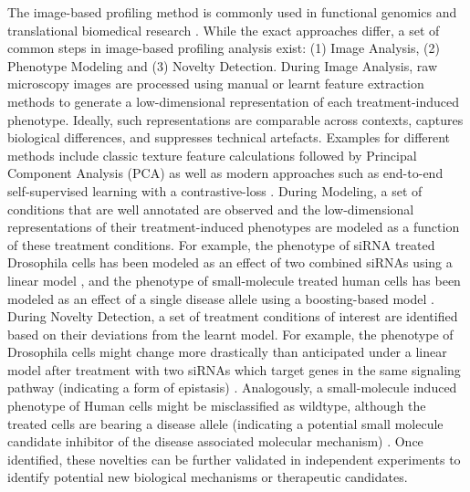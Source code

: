 \begin{flushleft}
The image-based profiling method is commonly used in functional genomics \parencite{lauferMappingGeneticInteractions2013, billmannGeneticInteractionMap2016} and translational biomedical research \parencite{gibsonStrategyIdentifyingRepurposed2015, moshkovPredictingCompoundActivity2023}. While the exact approaches differ, a set of common steps in image-based profiling analysis exist: (1) Image Analysis, (2) Phenotype Modeling and (3) Novelty Detection. During Image Analysis, raw microscopy images are processed using manual or learnt feature extraction methods to generate a low-dimensional representation of each treatment-induced phenotype. Ideally, such representations are comparable across contexts, captures biological differences, and suppresses technical artefacts. Examples for different methods include classic texture feature calculations followed by Principal Component Analysis (PCA) \parencite{caicedoDataanalysisStrategiesImagebased2017} as well as modern approaches such as end-to-end self-supervised learning with a contrastive-loss \parencite{perakisContrastiveLearningSingleCell2021}. During Modeling, a set of conditions that are well annotated are observed and the low-dimensional representations of their treatment-induced phenotypes are modeled as a function of these treatment conditions. For example, the phenotype of siRNA treated Drosophila cells has been modeled as an effect of two combined siRNAs using a linear model \parencite{billmannGeneticInteractionMap2016}, and the phenotype of small-molecule treated human cells has been modeled as an effect of a single disease allele using a boosting-based model \parencite{gibsonStrategyIdentifyingRepurposed2015}. During Novelty Detection, a set of treatment conditions of interest are identified based on their deviations from the learnt model. For example, the phenotype of Drosophila cells might change more drastically than anticipated under a linear model after treatment with two siRNAs which target genes in the same signaling pathway (indicating a form of epistasis) \parencite{billmannGeneticInteractionMap2016}. Analogously, a small-molecule induced phenotype of Human cells might be misclassified as wildtype, although the treated cells are bearing a disease allele (indicating a potential small molecule candidate inhibitor of the disease associated molecular mechanism) \parencite{gibsonStrategyIdentifyingRepurposed2015}. Once identified, these novelties can be further validated in independent experiments to identify potential new biological mechanisms or therapeutic candidates.
\par


\end{flushleft}
